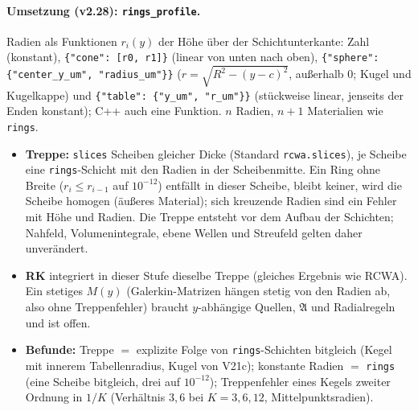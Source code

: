 \paragraph{Umsetzung (v2.28): \texttt{rings\_profile}.}
Radien als Funktionen $r_i(y)$ der Höhe über der Schichtunterkante: Zahl (konstant), \verb|{"cone": [r0, r1]}|
(linear von unten nach oben), \verb|{"sphere": {"center_y_um", "radius_um"}}| ($r=\sqrt{R^2-(y-c)^2}$, außerhalb $0$;
Kugel und Kugelkappe) und \verb|{"table": {"y_um", "r_um"}}| (stückweise linear, jenseits der Enden konstant); C++ auch
eine Funktion. $n$ Radien, $n+1$ Materialien wie \verb|rings|.
\begin{itemize}[nosep]
  \item \textbf{Treppe:} \verb|slices| Scheiben gleicher Dicke (Standard \verb|rcwa.slices|), je Scheibe eine
        \verb|rings|-Schicht mit den Radien in der Scheibenmitte. Ein Ring ohne Breite ($r_i\le r_{i-1}$ auf $10^{-12}$)
        entfällt in dieser Scheibe, bleibt keiner, wird die Scheibe homogen (äußeres Material); sich kreuzende Radien
        sind ein Fehler mit Höhe und Radien. Die Treppe entsteht vor dem Aufbau der Schichten; Nahfeld,
        Volumenintegrale, ebene Wellen und Streufeld gelten daher unverändert.
  \item \textbf{RK} integriert in dieser Stufe dieselbe Treppe (gleiches Ergebnis wie RCWA). Ein stetiges $M(y)$
        (Galerkin-Matrizen hängen stetig von den Radien ab, also ohne Treppenfehler) braucht $y$-abhängige
        Quellen, $\mathfrak A$ und Radialregeln und ist offen.
  \item \textbf{Befunde:} Treppe $=$ explizite Folge von \verb|rings|-Schichten bitgleich (Kegel mit innerem Tabellenradius,
        Kugel von V21c); konstante Radien $=$ \verb|rings| (eine Scheibe bitgleich, drei auf $10^{-12}$); Treppenfehler
        eines Kegels zweiter Ordnung in $1/K$ (Verhältnis $3{,}6$ bei $K=3,6,12$, Mittelpunktsradien).
\end{itemize}

